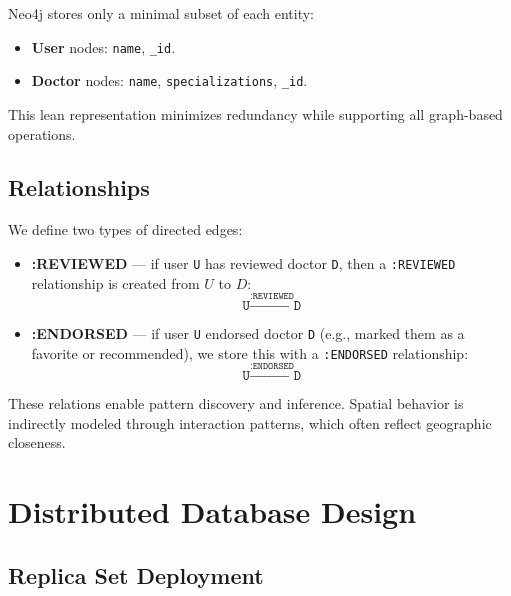 Neo4j stores only a minimal subset of each entity:
\begin{itemize}
  \item \textbf{User} nodes: \texttt{name}, \texttt{\_id}.
  \item \textbf{Doctor} nodes: \texttt{name}, \texttt{specializations}, \texttt{\_id}.
\end{itemize}

This lean representation minimizes redundancy while supporting all graph-based operations.

\subsection{Relationships}

We define two types of directed edges:
\begin{itemize}
  \item \textbf{:REVIEWED} — if user \texttt{U} has reviewed doctor \texttt{D}, then a \texttt{:REVIEWED} relationship is created from $U$ to $D$:  
  \[
    \texttt{U} \xrightarrow{\texttt{:REVIEWED}} \texttt{D}
  \]

  \item \textbf{:ENDORSED} — if user \texttt{U} endorsed doctor \texttt{D} (e.g., marked them as a favorite or recommended), we store this with a \texttt{:ENDORSED} relationship:  
  \[
    \texttt{U} \xrightarrow{\texttt{:ENDORSED}} \texttt{D}
  \]
\end{itemize}

These relations enable pattern discovery and inference. Spatial behavior is indirectly modeled through interaction patterns, which often reflect geographic closeness.

\section{Distributed Database Design}

\subsection{Replica Set Deployment}

